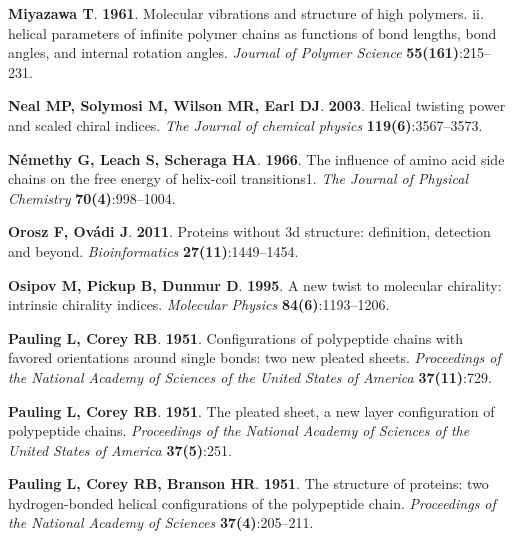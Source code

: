 \documentclass[fleqn,10pt,lineno]{wlpeerj} %
\begin{document}
\begin{thebibliography}{58}
\textbf{Miyazawa T}. \textbf{1961}.
\newblock Molecular vibrations and structure of high polymers. ii. helical
  parameters of infinite polymer chains as functions of bond lengths, bond
  angles, and internal rotation angles.
\newblock \emph{Journal of Polymer Science} \textbf{55(161)}:215--231.

\textbf{Neal MP, Solymosi M, Wilson MR, Earl DJ}. \textbf{2003}.
\newblock Helical twisting power and scaled chiral indices.
\newblock \emph{The Journal of chemical physics} \textbf{119(6)}:3567--3573.

\textbf{N{\'e}methy G, Leach S, Scheraga HA}. \textbf{1966}.
\newblock The influence of amino acid side chains on the free energy of
  helix-coil transitions1.
\newblock \emph{The Journal of Physical Chemistry} \textbf{70(4)}:998--1004.

\textbf{Orosz F, Ov{\'a}di J}. \textbf{2011}.
\newblock Proteins without 3d structure: definition, detection and beyond.
\newblock \emph{Bioinformatics} \textbf{27(11)}:1449--1454.

\textbf{Osipov M, Pickup B, Dunmur D}. \textbf{1995}.
\newblock A new twist to molecular chirality: intrinsic chirality indices.
\newblock \emph{Molecular Physics} \textbf{84(6)}:1193--1206.

\textbf{Pauling L, Corey RB}. \textbf{1951}{}.
\newblock Configurations of polypeptide chains with favored orientations around
  single bonds: two new pleated sheets.
\newblock \emph{Proceedings of the National Academy of Sciences of the United
  States of America} \textbf{37(11)}:729.

\textbf{Pauling L, Corey RB}. \textbf{1951}{}.
\newblock The pleated sheet, a new layer configuration of polypeptide chains.
\newblock \emph{Proceedings of the National Academy of Sciences of the United
  States of America} \textbf{37(5)}:251.

\textbf{Pauling L, Corey RB, Branson HR}. \textbf{1951}.
\newblock The structure of proteins: two hydrogen-bonded helical configurations
  of the polypeptide chain.
\newblock \emph{Proceedings of the National Academy of Sciences}
  \textbf{37(4)}:205--211.


\end{thebibliography}
\end{document}
